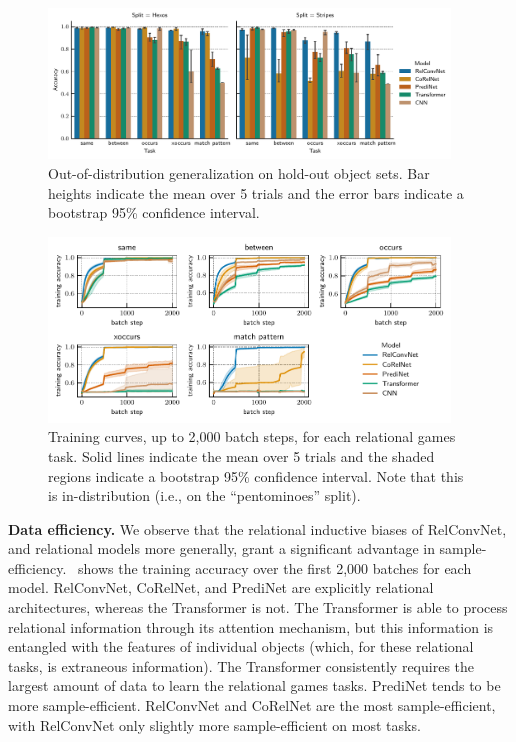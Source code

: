 \begin{figure}[t]
    \centering
    \includegraphics[width=0.95\textwidth]{figs/experiments/relgames_ood_acc.pdf}
    \caption{Out-of-distribution generalization on hold-out object sets. Bar heights indicate the mean over 5 trials and the error bars indicate a bootstrap 95\% confidence interval.}\label{fig:ood_generalization}
\end{figure}
\begin{figure}[t]
    \centering
    \includegraphics[width=0.95\textwidth]{figs/experiments/all_training_curves.pdf}
    \caption{Training curves, up to 2,000 batch steps, for each relational games task. Solid lines indicate the mean over 5 trials and the shaded regions indicate a bootstrap 95\% confidence interval. Note that this is in-distribution (i.e., on the ``pentominoes'' split).}\label{fig:training_curves}
\end{figure}

\textbf{Data efficiency.} We observe that the relational inductive biases of RelConvNet, and relational models more generally, grant a significant advantage in sample-efficiency.~ shows the training accuracy over the first 2,000 batches for each model. RelConvNet, CoRelNet, and PrediNet are explicitly relational architectures, whereas the Transformer is not. The Transformer is able to process relational information through its attention mechanism, but this information is entangled with the features of individual objects (which, for these relational tasks, is extraneous information). The Transformer consistently requires the largest amount of data to learn the relational games tasks. PrediNet tends to be more sample-efficient. RelConvNet and CoRelNet are the most sample-efficient, with RelConvNet only slightly more sample-efficient on most tasks.

